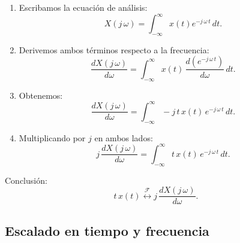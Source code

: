 \begin{enumerate}
	\item Escribamos la ecuación de análisis:
	\begin{equation}
		X(j \, \omega) = \int_{-\infty}^{\infty} x(t) e^{-j \, \omega \, t} \, dt.
	\end{equation}
	
	\item Derivemos ambos términos respecto a la frecuencia:
	\begin{equation}
		\frac{dX(j \, \omega)}{d\omega} = \int_{-\infty}^{\infty} x(t) \, \frac{d(e^{-j \, \omega \, t})}{d\omega} \, dt.
	\end{equation}
	
	\item Obtenemos:
	\begin{equation}
		\frac{dX(j \, \omega)}{d\omega} = \int_{-\infty}^{\infty} -j \, t \, x(t) \, e^{-j \, \omega \, t} \, dt.
	\end{equation}
	
	\item Multiplicando por $j$ en ambos lados:
	\begin{equation}
		j \, \frac{dX(j \, \omega)}{d\omega} = \int_{-\infty}^{\infty} t \, x(t) \, e^{-j \, \omega \, t} \, dt.
	\end{equation}
	
\end{enumerate}

Conclusión:
\begin{equation}
	t \, x(t) \stackrel{\mathcal{F}}{\longleftrightarrow} j \, \frac{dX(j \, \omega)}{d\omega} .
\end{equation}


\subsection{Escalado en tiempo y frecuencia}

